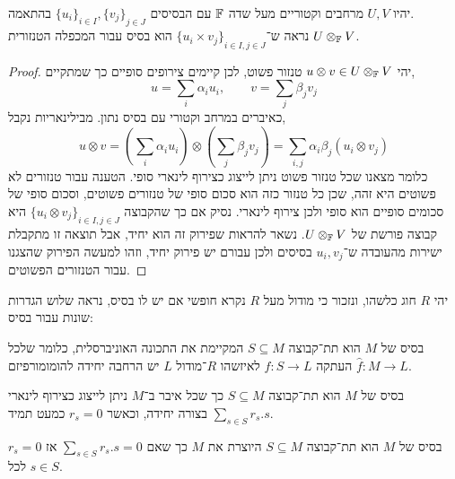\question{}
יהיו $U, V$ מרחבים וקטוריים מעל שדה $\mathbb{F}$ עם הבסיסים ${\{ u_i \}}_{i \in I}, {\{ v_j \}}_{j \in J}$ בהתאמה. \\
נראה ש־${\{ u_i \times v_j \}}_{i \in I, j \in J}$ הוא בסיס עבור המכפלה הטנזורית $U \otimes_{\mathbb{F}} V$.
\begin{proof}
	יהי $u \otimes v \in U \otimes_{\mathbb{F}} V$ טנזור פשוט, לכן קיימים צירופים סופיים כך שמתקיים,
	\[
		u = \sum_i \alpha_i u_i,
		\qquad
		v = \sum_j \beta_j v_j
	\]
	כאיברים במרחב וקטורי עם בסיס נתון.
	מבילינאריות נקבל,
	\[
		u \otimes v
		= \left(\sum_i \alpha_i u_i\right) \otimes \left(\sum_j \beta_j v_j\right)
		= \sum_{i, j} \alpha_i \beta_j (u_i \otimes v_j)
	\]
	כלומר מצאנו שכל טנזור פשוט ניתן לייצוג כצירוף לינארי סופי. הטענה עבור טנזורים לא פשוטים היא זהה, שכן כל טנזור כזה הוא סכום סופי של טנזורים פשוטים, וסכום סופי של סכומים סופיים הוא סופי ולכן צירוף לינארי.
	נסיק אם כך שהקבוצה ${\{ u_i \otimes v_j \}}_{i \in I, j \in J}$ היא קבוצה פורשת של $U \otimes_{\mathbb{F}} V$.
	נשאר להראות שפירוק זה הוא יחיד, אבל תוצאה זו מתקבלת ישירות מהעובדה ש־$u_i, v_j$ בסיסים ולכן עבורם יש פירוק יחיד, וזהו למעשה הפירוק שהצגנו עבור הטנזורים הפשוטים.
\end{proof}

\question{}
יהי $R$ חוג כלשהו, ונזכור כי מודול מעל $R$ נקרא חופשי אם יש לו בסיס, נראה שלוש הגדרות שונות עבור בסיס:
\begin{definition}
	בסיס של $M$ הוא תת־קבוצה $S \subseteq M$ המקיימת את התכונה האוניברסלית, כלומר שלכל העתקה $f : S \to L$ לאיזשהו $R$־מודול $L$ יש הרחבה יחידה להומומורפיזם $\hat{f} : M \to L$.
\end{definition}
\begin{definition}
	בסיס של $M$ הוא תת־קבוצה $S \subseteq M$ כך שכל איבר ב־$M$ ניתן לייצוג כצירוף לינארי $\sum_{s \in S} r_s . s$ בצורה יחידה, וכאשר $r_s = 0$ כמעט תמיד.
\end{definition}
\begin{definition}
	בסיס של $M$ הוא תת־קבוצה $S \subseteq M$ היוצרת את $M$ כך שאם $\sum_{s \in S} r_s . s = 0$ אז $r_s = 0$ לכל $s \in S$.
\end{definition}

